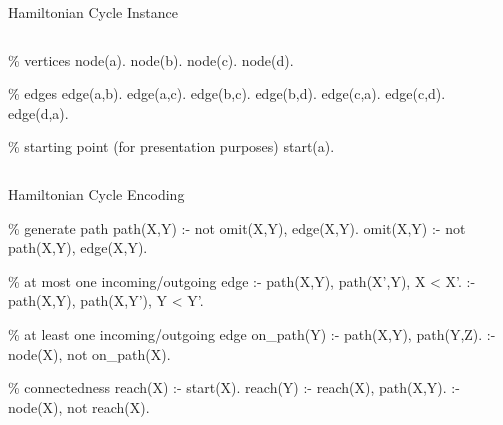 \begin{frame}[fragile]{Hamiltonian Cycle Instance}
  \vfill
  \begin{columns}
    \begin{column}{0.4\textwidth}
      \begin{minipage}{.4\textwidth}
      \begin{semiverbatim}
{\color{comment}\% vertices}
node(a).  node(b).
node(c).  node(d).

{\color{comment}\% edges}
edge(a,b).  edge(a,c).
edge(b,c).  edge(b,d).
edge(c,a).  edge(c,d).
edge(d,a).

{\color{comment}\% starting point (for presentation purposes)}
start(a).
      \end{semiverbatim}
    \end{minipage}
    \end{column}
    \begin{column}{0.4\textwidth}
      \centering
      \Graph
    \end{column}
  \end{columns}
\end{frame}

\begin{frame}[fragile]{Hamiltonian Cycle Encoding}
  \vfill
\begin{SemiVerbatim}[\small]{.9}
{\color{comment}\% generate path}
path(X,Y) :- not omit(X,Y), edge(X,Y).
omit(X,Y) :- not path(X,Y), edge(X,Y).

{\color{comment}\% at most one incoming/outgoing edge}
:- path(X,Y), path(X',Y), X < X'.
:- path(X,Y), path(X,Y'), Y < Y'.

{\color{comment}\% at least one incoming/outgoing edge}
on_path(Y) :- path(X,Y), path(Y,Z).
:- node(X), not on_path(X).

{\color{comment}\% connectedness}
reach(X) :- start(X).
reach(Y) :- reach(X), path(X,Y).
:- node(X), not reach(X).
\end{SemiVerbatim}
\end{frame}

